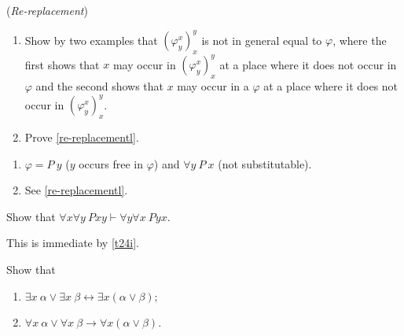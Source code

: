 \setcounter{exercise}{8}

\begin{exercise}
  (\textit{Re-replacement})\begin{enumerate}[label=(\alph*)]
    \item Show by two examples that $(\varphi_y^x)_x^y$ is not in general equal to $\varphi$, where the first shows that $x$ may occur in $(\varphi_y^x)_x^y$ at a place where it does not occur in $\varphi$ and the second shows that $x$ may occur in a $\varphi$ at a place where it does not occur in $(\varphi_y^x)_x^y$.
    \item Prove \ref{re-replacementl}.\qedhere
  \end{enumerate}
\end{exercise}

\begin{enumerate}[label=(\alph*)]
  \item $\varphi=P\ y$ ($y$ occurs free in $\varphi$) and $\forall y\ P\ x$ (not substitutable).
  \item See \ref{re-replacementl}.
\end{enumerate}

\begin{exercise}
  Show that $\forall x\forall y\ Pxy\vdash\forall y\forall x\ Pyx.$\qedhere
\end{exercise}

This is immediate by \ref{t24i}.

\setcounter{exercise}{14}

\begin{exercise}
  Show that
  \begin{enumerate}[label=(\alph*)]
    \item $\exists x\ \alpha\vee\exists x\ \beta \leftrightarrow \exists x(\alpha\vee \beta);$
    \item $\forall x\ \alpha\vee\forall x\ \beta \rightarrow \forall x(\alpha\vee \beta).$\qedhere
  \end{enumerate}
\end{exercise}

